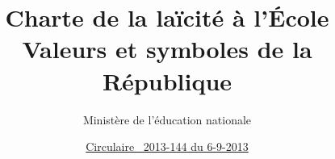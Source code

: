 \documentclass{article}
\title{Charte de la laïcité à l’École\\{\Large Valeurs et symboles de la République}}
\author{Ministère de l’éducation nationale}
\date{\href{http://www.education.gouv.fr/pid25535/bulletin_officiel.html?cid_bo=73659}{Circulaire \no{}~2013-144 du 6-9-2013}}
\begin{document}
\maketitle
\renewcommand{\contentsname}{Sommaire}
\tableofcontents

\end{document}
